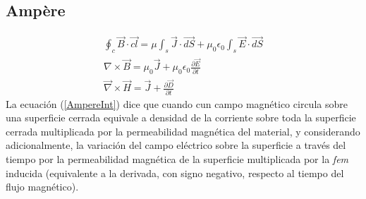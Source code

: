 \documentclass[12pt,spanish,lettersize]{article}
\begin{document}
\subsection{Amp\`ere}
\begin{eqnarray}
\oint_c\overrightarrow{B}\cdot\overrightarrow{cl}=\mu\int_s\overrightarrow{J}\cdot\overrightarrow{dS}+\mu_0\epsilon_0\int_s\overrightarrow{E}\cdot\overrightarrow{dS}\label{AmpereInt}\\
\nabla\times\overrightarrow{B}=\mu_0\overrightarrow{J}+\mu_0\epsilon_0\frac{\partial\overrightarrow{E}}{\partial t}\\
\overrightarrow{\nabla}\times\overrightarrow{H}=\overrightarrow{J}+\frac{\partial\overrightarrow{D}}{\partial t}
\end{eqnarray}
La ecuaci\'on (\ref{AmpereInt}) dice que cuando cun campo magn\'etico circula sobre una superficie cerrada equivale a densidad de la corriente sobre toda la superficie cerrada multiplicada por la permeabilidad magn\'etica del material, y considerando adicionalmente, la variaci\'on del campo el\'ectrico sobre la superficie a trav\'es del tiempo por la permeabilidad magn\'etica de la superficie multiplicada por la \emph{fem} inducida (equivalente a la derivada, con signo negativo, respecto al tiempo del flujo magn\'etico).
\end{document}
